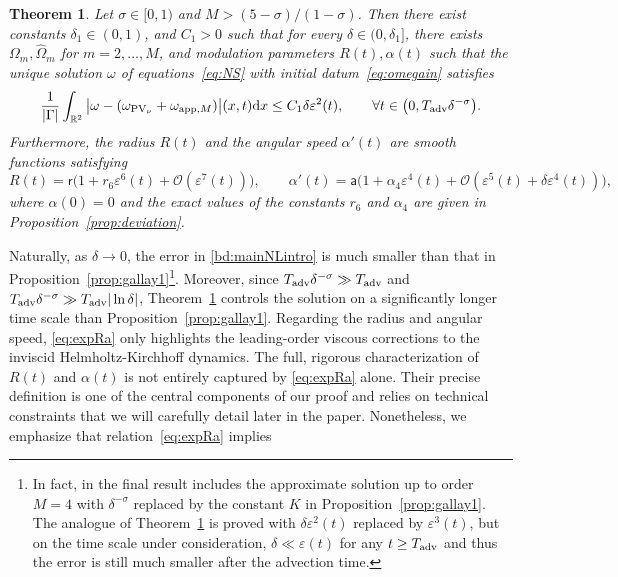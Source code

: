 \documentclass[11pt,reqno,a4paper]{amsart}
\def\dd{{\rm d}}
\def\eps{\varepsilon}
\def\R {\mathbb{R}} %
\newcommand{\cO}{\mathcal{O}}
\newcommand{\1}{\mathbbm{1}}
\newtheorem{theorem}[proposition]{Theorem}
\theoremstyle{definition}
\theoremstyle{definition}
\numberwithin{equation}{section}
\begin{document}
\begin{theorem}\label{theo:main}
        Let $\sigma\in [0,1)$ and $M>(5-\sigma)/(1-\sigma)$. Then there exist constants $\delta_1 \in (0,1)$, and  $C_1>0$ such that for every $\delta \in(0, \delta_1]$, there exists $\Omega_m,\widehat{\Omega}_m$ for $m=2,\dots,M$, and modulation parameters $R(t),\alpha(t)$ such that the unique solution $\omega$ of equations~\cref{eq:NS} with initial datum~\cref{eq:omegain} satisfies
    \begin{equation}
    \label{bd:mainNLintro}
        \frac{1}{|\Gamma|}\int_{\R^2} \big|\omega - (\omega_{\mathrm{PV}_\nu}+\omega_{{\rm app},M})\big|(x,t) \dd x \le C_1 \delta\eps^2(t), \qquad \forall t \in \big(0,T_{\rm adv} \delta^{-\sigma} \big).
    \end{equation}
    Furthermore, the radius $R(t)$ and the angular speed $\alpha'(t)$ are smooth functions satisfying 
    \begin{equation}
    \label{eq:expRa}
    R(t)=\mathsf{r}\big(1+r_6 \eps^6(t) + \cO(\eps^7(t))\big), \qquad \alpha'(t) = \mathsf{a} \big(1+\alpha_4\eps^4(t)+\cO(\eps^5(t)+\delta \eps^4(t))\big),
\end{equation}
where $\alpha(0)=0$ and the exact values of the constants $r_6$ and $\alpha_4$ are given in Proposition~\ref{prop:deviation}. 
\end{theorem}
Naturally, as $\delta \to 0$, the error in \cref{bd:mainNLintro} is much smaller than that in Proposition~\ref{prop:gallay1}\footnote{In fact, in \cite{Gallay2011} the final result includes the approximate solution up to order $M=4$ with $\delta^{-\sigma}$ replaced by the constant $K$ in Proposition~\ref{prop:gallay1}. The analogue of Theorem~\ref{theo:main} is proved with $\delta \eps^2(t)$ replaced by $\eps^3(t)$, but on the time scale under consideration, $\delta \ll \eps(t)$ for any $t \ge T_{\rm adv}$ and thus the error is still much smaller after the advection time.}. 
Moreover, since $T_{\rm adv} \delta^{-\sigma} \gg T_{\rm adv}$ and $T_{\rm adv} \delta^{-\sigma} \gg T_{\rm adv} |\ln\delta|$, Theorem~\ref{theo:main} controls the solution on a significantly longer time scale than Proposition~\ref{prop:gallay1}. Regarding the  radius and angular speed, \cref{eq:expRa} only highlights the leading-order viscous corrections to the inviscid Helmholtz-Kirchhoff dynamics. The full, rigorous characterization of $R(t)$ and $\alpha(t)$ is not entirely captured by \cref{eq:expRa} alone. Their precise definition is one of the central components of our proof and relies on technical constraints that we will carefully detail later in the paper. Nonetheless, we emphasize that relation~\cref{eq:expRa} implies
\end{document}
